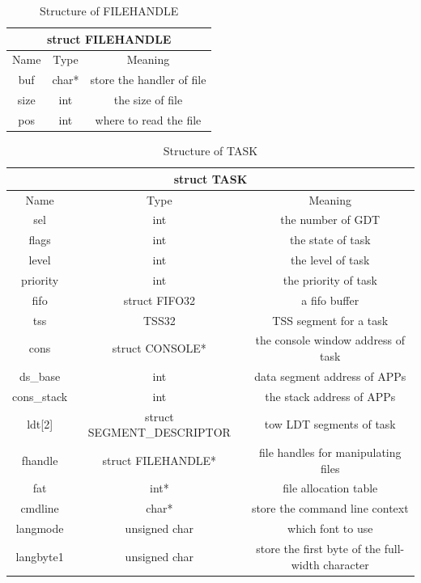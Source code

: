 \documentclass{swfcthesis}
\begin{document}
\begin{table}[!htbp]
  \centering
  \begin{tabular}{|c|c|c|}
    \hline
    \multicolumn{3}{|c|}{struct FILEHANDLE} \\
    \hline
    Name & Type & Meaning \\
    \hline
    buf & char* & store the handler of file \\
    \hline
    size & int & the size of file \\
    \hline
    pos & int & where to read the file \\
    \hline
  \end{tabular}
  \caption{Structure of FILEHANDLE}
  \label{tab:FILEHANDLE}
\end{table}

\begin{table}[!htbp]
  \centering
  \begin{tabular}{|c|c|c|}
    \hline
    \multicolumn{3}{|c|}{struct TASK} \\
    \hline
    Name & Type & Meaning \\
    \hline
    sel & int & the number of GDT \\
    \hline
    flags & int & the state of task \\
    \hline
    level & int & the level of task \\
    \hline
    priority & int & the priority of task \\
    \hline
    fifo & struct FIFO32 & a fifo buffer \\
    \hline
    tss & TSS32 & TSS segment for a task \\
    \hline
    cons & struct CONSOLE* & the console window address of task \\
    \hline
    ds\_base & int & data segment address of APPs \\
    \hline
    cons\_stack & int & the stack address of APPs \\ 
    \hline 
    ldt[2] & struct SEGMENT\_DESCRIPTOR &  tow LDT segments of task \\
    \hline
    fhandle & struct FILEHANDLE* & file handles for manipulating files \\
    \hline
    fat & int* & file allocation table \\
    \hline
    cmdline & char* & store the command line context \\
    \hline
    langmode & unsigned char & which font to use \\
    \hline
    langbyte1 & unsigned char & store the first byte of the full-width character \\
    \hline
  \end{tabular}
  \caption{Structure of TASK}
  \label{tab:TASK}
\end{table}
\end{document}
